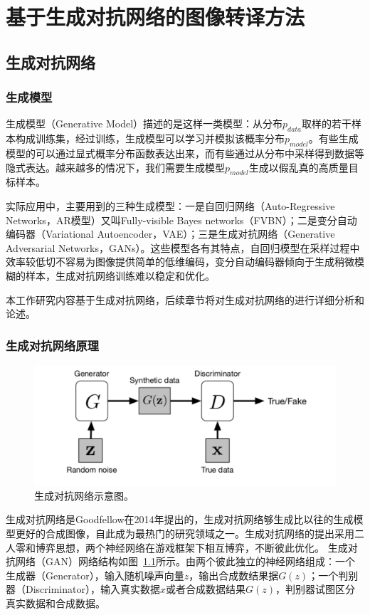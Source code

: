 \chapter{基于生成对抗网络的图像转译方法}
\section{生成对抗网络}
\subsection{生成模型}
生成模型（Generative Model）描述的是这样一类模型：从分布$p_{data}$取样的若干样本构成训练集，经过训练，生成模型可以学习并模拟该概率分布$p_{model}$。有些生成模型的可以通过显式概率分布函数表达出来，而有些通过从分布中采样得到数据等隐式表达。越来越多的情况下，我们需要生成模型$p_{model}$生成以假乱真的高质量目标样本。

实际应用中，主要用到的三种生成模型：一是自回归网络（Auto-Regressive Networks，AR模型）又叫Fully-visible Bayes networks（FVBN）；二是变分自动编码器（Variational Autoencoder，VAE）；三是生成对抗网络（Generative Adversarial Networks，GANs）。这些模型各有其特点，自回归模型在采样过程中效率较低切不容易为图像提供简单的低维编码，变分自动编码器倾向于生成稍微模糊的样本，生成对抗网络训练难以稳定和优化。

本工作研究内容基于生成对抗网络，后续章节将对生成对抗网络的进行详细分析和论述。


\subsection{生成对抗网络原理}
\begin{figure}[ht]
    \centering
	\includegraphics[width=\textwidth]{figs/gan.pdf}
	\caption{生成对抗网络示意图。}
	\label{fig:pic_gan}
\end{figure}
生成对抗网络是Goodfellow在2014年提出的，生成对抗网络够生成比以往的生成模型更好的合成图像，自此成为最热门的研究领域之一。生成对抗网络的提出采用二人零和博弈思想，两个神经网络在游戏框架下相互博弈，不断彼此优化。
生成对抗网络（GAN）网络结构如图~\ref{fig:pic_gan}所示。由两个彼此独立的神经网络组成：一个生成器（Generator），输入随机噪声向量$z$，输出合成数结果据$G(z)$；一个判别器（Discriminator），输入真实数据$x$或者合成数据结果$G(z)$，判别器试图区分真实数据和合成数据。


